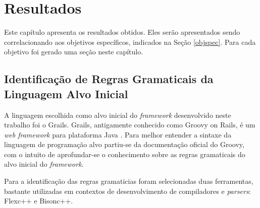 \chapter[Resultados]{Resultados}
Este capítulo apresenta os resultados obtidos. Eles serão apresentados sendo
correlacionando aos objetivos específicos, indicados na Seção \ref{objspec}.
Para cada objetivo foi gerado uma seção neste capítulo.

\section{Identificação de Regras Gramaticais da Linguagem Alvo Inicial}
A linguagem escolhida como alvo inicial do \textit{framework} desenvolvido
neste trabalho foi o \textsf{Grails}. \textsf{Grails}, antigamente conhecido
como \textsf{Groovy on Rails}, é um \textit{web framework} para plataforma Java
\cite{grails2015}. Para melhor entender a sintaxe da linguagem de programação
alvo partiu-se da documentação oficial do \textsf{Groovy}, com o intuito de
aprofundar-se o conhecimento sobre as regras gramaticais do alvo inicial do
\textit{framework}.

Para a identificação das regras gramaticias foram selecionadas duas ferramentas,
bastante utilizadas em contextos de desenvolvimento de compiladores e
\textit{parsers}: \textsf{Flexc++} e \textsf{Bisonc++}. 










